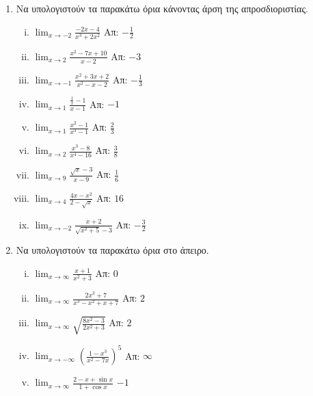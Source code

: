 

\pagestyle{askhseis}
\everymath{\displaystyle}



\begin{center}
  \minibox{\bfseries\large \textcolor{Col1}{Ασκήσεις στα Όρια}}
\end{center}

\vspace{\baselineskip}


\begin{enumerate}
    \item Να υπολογιστούν τα παρακάτω όρια κάνοντας άρση της απροσδιοριστίας.

        \begin{enumerate}[i)]
            \item $\lim_{x\to -2}\frac{-2x-4}{x^3+2x^2}$ \hfill Απ: $-\frac{1}{2}$
            \item $\lim_{x\to 2}\frac{x^2-7x+10}{x-2}$ \hfill Απ: $-3$
            \item $\lim_{x\to -1}\frac{x^2+3x+2}{x^2-x-2}$ \hfill Απ: $-\frac{1}{3}$
            \item $\lim_{x\to 1}\frac{\frac{1}{x}-1}{x-1}$ \hfill Απ: $-1$
            \item $\lim_{x\to 1}\frac{x^2-1}{x^3-1}$ \hfill Απ: $\frac{2}{3}$
            \item $\lim_{x\to 2}\frac{x^3-8}{x^4-16}$ \hfill Απ: $\frac{3}{8}$
            \item $\lim_{x\to 9}\frac{\sqrt{x}-3}{x-9}$ \hfill Απ: $\frac{1}{6}$
            \item $\lim_{x\to 4}\frac{4x-x^2}{2-\sqrt{x}}$ \hfill Απ: $16$
            \item $\lim_{x\to -2}\frac{x+2}{\sqrt{x^2+5}-3}$ \hfill Απ: $-\frac{3}{2}$
        \end{enumerate}

    \item Να υπολογιστούν τα παρακάτω όρια στο άπειρο.

        \begin{enumerate}[i)]
            \item $\lim_{x\to \infty}\frac{x+1}{x^2+3}$ \hfill Απ: $0$
            \item $\lim_{x\to \infty}\frac{2x^3+7}{x^3-x^2+x+7}$ \hfill Απ: $2$
            \item $\lim_{x\to \infty}\sqrt{\frac{8x^2-3}{2x^2 +3}}$ \hfill Απ: $2$
            \item $\lim_{x\to -\infty}\left(\frac{1-x^3}{x^2-7x}\right)^5$ 
                \hfill Απ: $\infty$
            \item $\lim_{x\to \infty}\frac{2-x+\sin x}{1+\cos x}$ \hfill $-1$
        \end{enumerate}


\end{enumerate}
